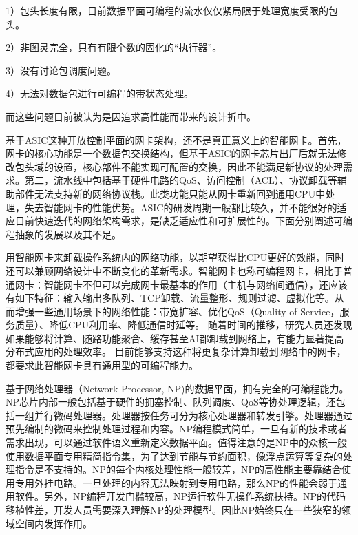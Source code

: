 1）包头长度有限，目前数据平面可编程的流水仅仅紧局限于处理宽度受限的包头。

2）非图灵完全，只有有限个数的固化的“执行器”。

3）没有讨论包调度问题。

4）无法对数据包进行可编程的带状态处理。

而这些问题目前被认为是因追求高性能而带来的设计折中。




\label{chap23}

基于ASIC这种开放控制平面的网卡架构，还不是真正意义上的智能网卡。首先，网卡的核心功能是一个数据包交换结构，但基于ASIC的网卡芯片出厂后就无法修改包头域的设置，核心部件不能实现可配置的交换，因此不能满足新协议的处理需求。第二，流水线中包括基于硬件电路的QoS、访问控制（ACL）、协议卸载等辅助部件无法支持新的网络协议栈。此类功能只能从网卡重新回到通用CPU中处理，失去智能网卡的性能优势。ASIC的研发周期一般都比较久，并不能很好的适应目前快速迭代的网络架构需求，是缺乏适应性和可扩展性的。下面分别阐述可编程抽象的发展以及其不足。



用智能网卡来卸载操作系统内的网络功能，以期望获得比CPU更好的效能，同时还可以兼顾网络设计中不断变化的革新需求。智能网卡也称可编程网卡，相比于普通网卡：智能网卡不但可以完成网卡最基本的作用（主机与网络间通信），还应该有如下特征：输入输出多队列、TCP卸载、流量整形、规则过滤、虚拟化等。从而增强一些通用场景下的网络性能：带宽扩容、优化QoS（Quality of Service，服务质量）、降低CPU利用率、降低通信时延等。
随着时间的推移，研究人员还发现如果能够将计算、随路功能聚合、缓存甚至AI都卸载到网络上，有能力显著提高分布式应用的处理效率。
目前能够支持这种将更复杂计算卸载到网络中的网卡，都要求此智能网卡具有通用型的可编程能力。

基于网络处理器（Network Processor, NP)的数据平面，拥有完全的可编程能力。NP芯片内部一般包括基于硬件的拥塞控制、队列调度、QoS等协处理逻辑，还包括一组并行微码处理器。处理器按任务可分为核心处理器和转发引擎。处理器通过预先编制的微码来控制处理过程和内容。NP编程模式简单，一旦有新的技术或者需求出现，可以通过软件语义重新定义数据平面。值得注意的是NP中的众核一般使用数据平面专用精简指令集，为了达到节能与节约面积，像浮点运算等复杂的处理指令是不支持的。NP的每个内核处理性能一般较差，NP的高性能主要靠结合使用专用外挂电路。一旦处理的内容无法映射到专用电路，那么NP的性能会弱于通用软件。另外，NP编程开发门槛较高，NP运行软件无操作系统扶持。NP的代码移植性差，开发人员需要深入理解NP的处理模型。因此NP始终只在一些狭窄的领域空间内发挥作用。



